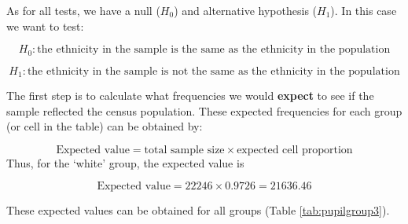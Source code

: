 \documentclass[
  oneside]{krantz}
\begin{document}
As for all tests, we have a null (\(H_0\)) and alternative hypothesis (\(H_1\)). In this case we want to test:

\[H_0: \textrm{the ethnicity in the sample is the same as the ethnicity in the population}\]

\[H_1: \textrm{the ethnicity in the sample is not the same as the ethnicity in the population}\]

The first step is to calculate what frequencies we would \textbf{expect} to see if the sample reflected the census population. These expected frequencies for each group (or cell in the table) can be obtained by:

\[\textrm{Expected value} = \textrm{total sample size} \times \textrm{expected cell proportion}\]
Thus, for the `white' group, the expected value is

\[ \textrm{Expected value} = 22246 \times 0.9726 = 21636.46\]

These expected values can be obtained for all groups (Table \ref{tab:pupilgroup3}).
\end{document}
